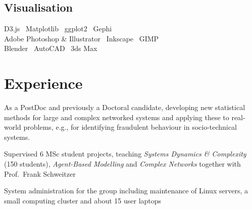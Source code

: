 \documentclass[]{vn-resume}
\newcommand*\bul{\textbullet{}}
\begin{document}
\begin{minipage}[t]{0.3\textwidth}
    \subsection{Visualisation}
    D3.js \bul\ Matplotlib \bul\ ggplot2 \bul\ Gephi \\
    Adobe Photoshop \& Illustrator \bul\ Inkscape \bul\ GIMP \\
    Blender \bul\ AutoCAD \bul\ 3ds Max \\

    
\end{minipage} 
\hfill
\begin{minipage}[t]{0.66\textwidth} 
    
    
    \section{Experience}
    \vspace{\topsep} %
    \begin{tightemize}
        \item As a PostDoc and previously a Doctoral candidate, developing new statistical methods for large and complex networked systems and applying these to real-world problems, e.g., for identifying fraudulent behaviour in socio-technical systems.
        \item Supervised 6 MSc student projects, teaching \emph{Systems Dynamics \& Complexity} (150 students), \emph{Agent-Based Modelling} and \emph{Complex Networks} together with Prof.~Frank Schweitzer
        \item System administration for the group including maintenance of Linux servers, a small computing cluster and about 15 user laptops
    \end{tightemize}
    \sectionsep


\end{minipage}
\end{document}
